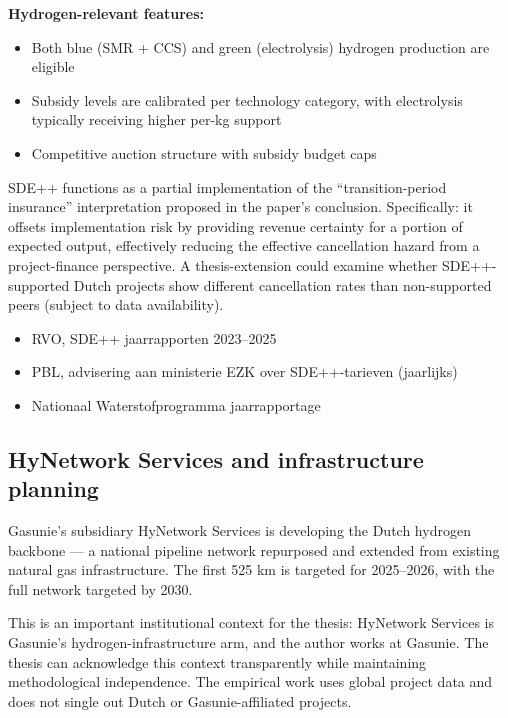 \documentclass[11pt,a4paper]{article}
\begin{document}
\textbf{Hydrogen-relevant features:}
\begin{itemize}
  \item Both blue (SMR + CCS) and green (electrolysis) hydrogen production are eligible
  \item Subsidy levels are calibrated per technology category, with electrolysis typically receiving higher per-kg support
  \item Competitive auction structure with subsidy budget caps
\end{itemize}

\begin{technote}
SDE++ functions as a partial implementation of the ``transition-period insurance'' interpretation proposed in the paper's conclusion. Specifically: it offsets implementation risk by providing revenue certainty for a portion of expected output, effectively reducing the effective cancellation hazard from a project-finance perspective. A thesis-extension could examine whether SDE++-supported Dutch projects show different cancellation rates than non-supported peers (subject to data availability).
\end{technote}

\begin{keysources}
\begin{itemize}
  \item RVO, SDE++ jaarrapporten 2023--2025
  \item PBL, advisering aan ministerie EZK over SDE++-tarieven (jaarlijks)
  \item Nationaal Waterstofprogramma jaarrapportage
\end{itemize}
\end{keysources}

\subsection{HyNetwork Services and infrastructure planning}

Gasunie's subsidiary HyNetwork Services is developing the Dutch hydrogen backbone --- a national pipeline network repurposed and extended from existing natural gas infrastructure. The first 525 km is targeted for 2025--2026, with the full network targeted by 2030.

\begin{technote}
This is an important institutional context for the thesis: HyNetwork Services is Gasunie's hydrogen-infrastructure arm, and the author works at Gasunie. The thesis can acknowledge this context transparently while maintaining methodological independence. The empirical work uses global project data and does not single out Dutch or Gasunie-affiliated projects.
\end{technote}
\end{document}
